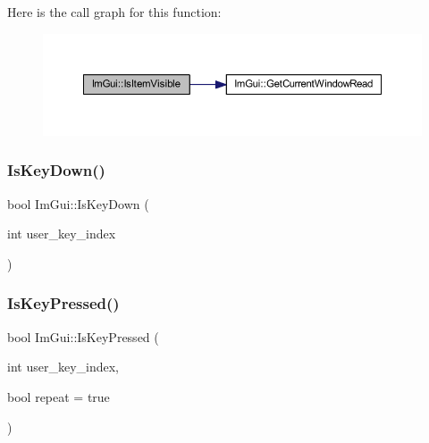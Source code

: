 Here is the call graph for this function\+:
\nopagebreak
\begin{figure}[H]
\begin{center}
\leavevmode
\includegraphics[width=350pt]{namespace_im_gui_a0e9273fc53bdf7ca39d59cdb657c3c2f_cgraph}
\end{center}
\end{figure}
\mbox{\label{namespace_im_gui_a633d848504c89e7756ddd33474bc78d2}} 
\subsubsection{\texorpdfstring{Is\+Key\+Down()}{IsKeyDown()}}
{\footnotesize\ttfamily bool Im\+Gui\+::\+Is\+Key\+Down (\begin{DoxyParamCaption}\item[{int}]{user\+\_\+key\+\_\+index }\end{DoxyParamCaption})}

\mbox{\label{namespace_im_gui_a83331a8afa5316bc98ed9c98b151ac01}} 
\subsubsection{\texorpdfstring{Is\+Key\+Pressed()}{IsKeyPressed()}}
{\footnotesize\ttfamily bool Im\+Gui\+::\+Is\+Key\+Pressed (\begin{DoxyParamCaption}\item[{int}]{user\+\_\+key\+\_\+index,  }\item[{bool}]{repeat = {\ttfamily true} }\end{DoxyParamCaption})}

